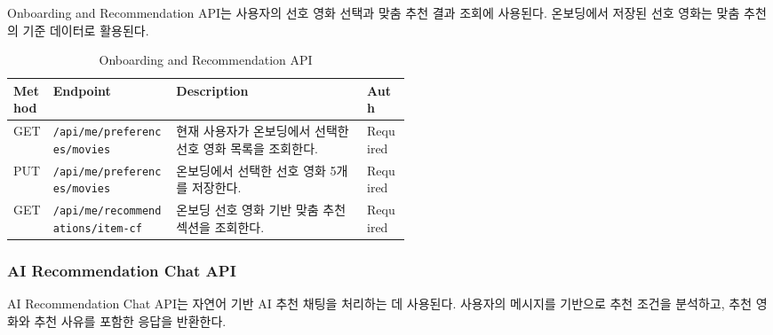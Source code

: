 \documentclass[11pt,a4paper]{article}
\renewcommand{\arraystretch}{1.18}
\begin{document}
Onboarding and Recommendation API는 사용자의 선호 영화 선택과 맞춤 추천 결과 조회에 사용된다. 온보딩에서 저장된 선호 영화는 맞춤 추천의 기준 데이터로 활용된다.

\begin{table}[H]
\centering
\footnotesize
\setlength{\tabcolsep}{5pt}
\renewcommand{\arraystretch}{1.28}
\begin{tabularx}{\linewidth}{@{}>{\RaggedRight\arraybackslash}p{0.10\linewidth}>{\RaggedRight\arraybackslash}p{0.31\linewidth}>{\RaggedRight\arraybackslash}X>{\RaggedRight\arraybackslash}p{0.11\linewidth}@{}}
\toprule
\textbf{Method} & \textbf{Endpoint} & \textbf{Description} & \textbf{Auth} \\
\midrule
GET & \texttt{/\allowbreak{}api/\allowbreak{}me/\allowbreak{}preferences/\allowbreak{}movies} & 현재 사용자가 온보딩에서 선택한 선호 영화 목록을 조회한다. & Required \\
PUT & \texttt{/\allowbreak{}api/\allowbreak{}me/\allowbreak{}preferences/\allowbreak{}movies} & 온보딩에서 선택한 선호 영화 5개를 저장한다. & Required \\
GET & \texttt{/\allowbreak{}api/\allowbreak{}me/\allowbreak{}recommendations/\allowbreak{}item-\allowbreak{}cf} & 온보딩 선호 영화 기반 맞춤 추천 섹션을 조회한다. & Required \\
\bottomrule
\end{tabularx}
\caption{Onboarding and Recommendation API}
\end{table}

\hypertarget{ai-recommendation-chat-api}{%
\subsubsection{AI Recommendation Chat API}\label{ai-recommendation-chat-api}}

AI Recommendation Chat API는 자연어 기반 AI 추천 채팅을 처리하는 데 사용된다. 사용자의 메시지를 기반으로 추천 조건을 분석하고, 추천 영화와 추천 사유를 포함한 응답을 반환한다.
\end{document}
